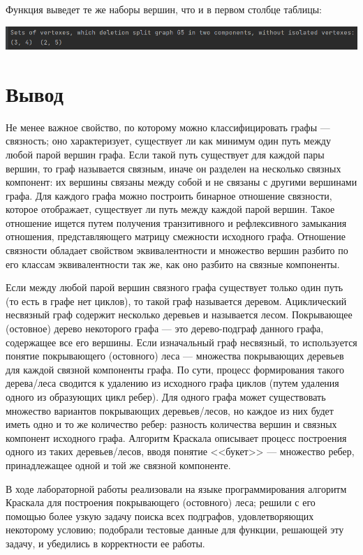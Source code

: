 \documentclass[12pt]{article}
\begin{document}
	Функция выведет те же наборы вершин, что и в первом столбце таблицы:
	
	 
	
	\includegraphics[width=170mm]{images/G5.png}
	
	\section{Вывод}
	\label{final}
	
	Не менее важное свойство, по которому можно классифицировать графы --- связность; оно характеризует, существует ли как минимум один путь между любой парой вершин графа. Если такой путь существует для каждой пары вершин, то граф называется связным, иначе он разделен на несколько связных компонент: их вершины связаны между собой и не связаны с другими вершинами графа. Для каждого графа можно построить бинарное отношение связности, которое отображает, существует ли путь между каждой парой вершин. Такое отношение ищется путем получения транзитивного и рефлексивного замыкания отношения, представляющего матрицу смежности исходного графа. Отношение связности обладает свойством эквивалентности и множество вершин разбито по его классам эквивалентности так же, как оно разбито на связные компоненты.
	
	Если между любой парой вершин связного графа существует только один путь (то есть в графе нет циклов), то такой граф называется деревом. Ациклический несвязный граф содержит несколько деревьев и называется лесом. Покрывающее (остовное) дерево некоторого графа --- это дерево-подграф данного графа, содержащее все его вершины. Если изначальный граф несвязный, то используется понятие покрывающего (остовного) леса --- множества покрывающих деревьев для каждой связной компоненты графа. По сути, процесс формирования такого дерева/леса сводится к удалению из исходного графа циклов (путем удаления одного из образующих цикл ребер). Для одного графа может существовать множество вариантов покрывающих деревьев/лесов, но каждое из них будет иметь одно и то же количество ребер: разность количества вершин и связных компонент исходного графа. Алгоритм Краскала описывает процесс построения одного из таких деревьев/лесов, вводя понятие <<букет>> --- множество ребер, принадлежащее одной и той же связной компоненте. 
	
	В ходе лабораторной работы реализовали на языке программирования алгоритм Краскала для построения покрывающего (остовного) леса; решили с его помощью более узкую задачу поиска всех подграфов, удовлетворяющих некоторому условию; подобрали тестовые данные для функции, решающей эту задачу, и убедились в корректности ее работы.
\end{document}
